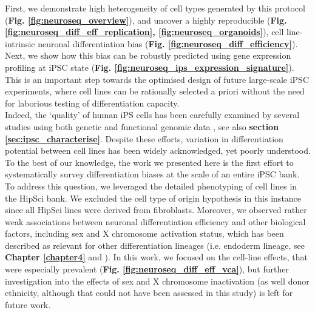 First, we demonstrate high heterogeneity of cell types generated by this protocol (\textbf{Fig. \ref{fig:neuroseq_overview}}), and uncover a highly reproducible (\textbf{Fig. \ref{fig:neuroseq_diff_eff_replication}, \ref{fig:neuroseq_organoids}}), cell line-intrinsic neuronal differentiation bias (\textbf{Fig. \ref{fig:neuroseq_diff_efficiency}}).
Next, we show how this bias can be robustly predicted using gene expression profiling at iPSC state (\textbf{Fig. \ref{fig:neuroseq_ips_expression_signature}}). 
This is an important step towards the optimised design of future large-scale iPSC experiments, where cell lines can be rationally selected a priori without the need for laborious testing of differentiation capacity. \\

Indeed, the `quality' of human iPS cells has been carefully examined by several studies using both genetic and functional genomic data \cite{muller2011bioinformatic, international2018assessment, tsankov2015qpcr, bock2011reference}, see also \textbf{section
\ref{sec:ipsc_characterise}}. 
Despite these efforts, variation in differentiation potential between cell lines has been widely acknowledged, yet poorly understood. 
To the best of our knowledge, the work we presented here is the first effort to systematically survey differentiation biases at the scale of an entire iPSC bank. 
To address this question, we leveraged the detailed phenotyping of cell lines in the HipSci bank.
We excluded the cell type of origin hypothesis \cite{hu2016effects} in this instance since all HipSci lines were derived from fibroblasts.
Moreover, we observed rather weak associations between neuronal differentiation efficiency and other biological factors, including sex and X chromosome activation status, which has been described as relevant for other differentiation lineages (i.e. endoderm lineage, see \textbf{Chapter \ref{chapter4}} and \cite{cuomo2020single}).
In this work, we focused on the cell-line effects, that were especially prevalent (\textbf{Fig. \ref{fig:neuroseq_diff_eff_vca}}), but further investigation into the effects of sex and X chromosome inactivation (as well donor ethnicity, although that could not have been assessed in this study) is left for future work.
